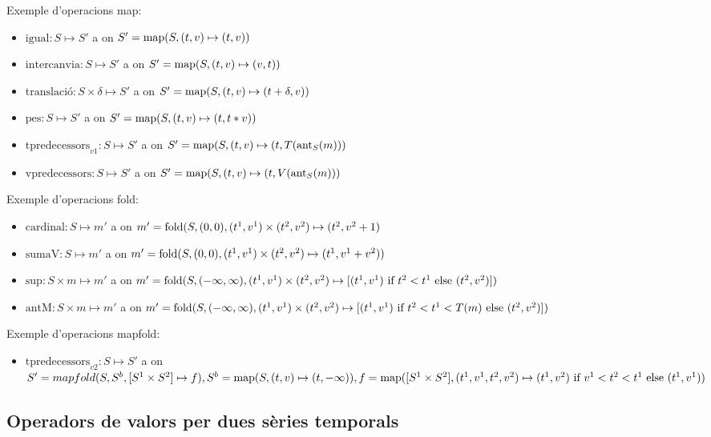 Exemple d'operacions map:
\begin{itemize}
\item $\text{igual}: S \mapsto S'$ a on $S'= \operatorname*{map}(S,(t,v)\mapsto(t,v))$
\item $\text{intercanvia}: S \mapsto S'$ a on $S'= \operatorname*{map}(S,(t,v)\mapsto(v,t))$
\item $\text{translació}: S \times \delta \mapsto S'$ a on $S'=
  \operatorname*{map}(S,(t,v)\mapsto(t+\delta,v))$
\item $\text{pes}: S \mapsto S'$ a on $S'= \operatorname*{map}(S,(t,v)\mapsto(t,t*v))$
\item $\text{tpredecessors}_{v1}: S \mapsto S'$ a on $S'= \operatorname*{map}(S,(t,v)
  \mapsto (t,T(\operatorname*{ant}_S(m)))$ 
\item $\text{vpredecessors}: S \mapsto S'$ a on $S'= \operatorname*{map}(S,(t,v)
  \mapsto (t,V(\operatorname*{ant}_S(m)))$
\end{itemize}

Exemple d'operacions fold:
\begin{itemize}
\item $\text{cardinal}: S \mapsto m'$ a on $m'=
  \operatorname*{fold}(S,(0,0),(t^1,v^1)\times(t^2,v^2)\mapsto(t^2,v^2+1)$
\item $\text{sumaV}: S \mapsto m'$ a on $m'=
  \operatorname*{fold}(S,(0,0),(t^1,v^1)\times(t^2,v^2)\mapsto(t^1,v^1+v^2))$
\item $\text{sup}: S \times m \mapsto m'$ a on $m'=
  \operatorname*{fold}(S,(-\infty,\infty),(t^1,v^1)\times(t^2,v^2)\mapsto [(t^1,v^1)
  \text{ if } t^2 < t^1 \text{ else } (t^2,v^2) ])$
\item $\text{antM}: S \times m \mapsto m'$ a on $m'=
  \operatorname*{fold}(S,(-\infty,\infty),(t^1,v^1)\times(t^2,v^2)\mapsto [(t^1,v^1)
  \text{ if } t^2 < t^1 < T(m) \text{ else } (t^2,v^2) ])$
\end{itemize}


Exemple d'operacions mapfold:
\begin{itemize}
\item $\text{tpredecessors}_{v2}: S \mapsto S'$ a on $S'=
  mapfold(S,S^b,[S^1\times S^2]\mapsto f), S^b =
  \operatorname*{map}(S,(t,v)\mapsto(t,-\infty)), f=\operatorname*{map}([S^1\times
  S^2],(t^1,v^1,t^2,v^2)\mapsto (t^1,v^2) \text{ if } v^1<t^2<t^1
  \text{ else } (t^1,v^1))$
\end{itemize}


\subsection{Operadors de valors per dues sèries temporals}

